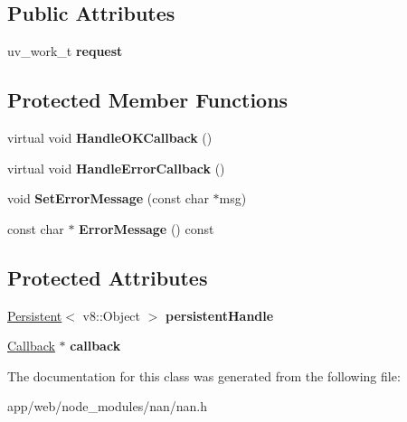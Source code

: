 \subsection*{Public Attributes}
\begin{DoxyCompactItemize}
\item 
\mbox{\label{class_nan_1_1_async_worker_ad93fc2e68413cea89fb529c4bd5f04b1}} 
uv\+\_\+work\+\_\+t {\bfseries request}
\end{DoxyCompactItemize}
\subsection*{Protected Member Functions}
\begin{DoxyCompactItemize}
\item 
\mbox{\label{class_nan_1_1_async_worker_a9946ddbe2ca5929329858b9cec36f68a}} 
virtual void {\bfseries Handle\+O\+K\+Callback} ()
\item 
\mbox{\label{class_nan_1_1_async_worker_a148febef6c47422fb0b3202e64cf3a51}} 
virtual void {\bfseries Handle\+Error\+Callback} ()
\item 
\mbox{\label{class_nan_1_1_async_worker_ad5fc83346a5870b091c12f82547e1cf1}} 
void {\bfseries Set\+Error\+Message} (const char $\ast$msg)
\item 
\mbox{\label{class_nan_1_1_async_worker_af17ed4e1f1d0f847de94dee9a8c043b5}} 
const char $\ast$ {\bfseries Error\+Message} () const
\end{DoxyCompactItemize}
\subsection*{Protected Attributes}
\begin{DoxyCompactItemize}
\item 
\mbox{\label{class_nan_1_1_async_worker_a8f9cf33aa27e45f76f707fcf42511ae1}} 
\hyperlink{class_nan_1_1_persistent}{Persistent}$<$ v8\+::\+Object $>$ {\bfseries persistent\+Handle}
\item 
\mbox{\label{class_nan_1_1_async_worker_ab04d3ed0b17e39fe2a989bcc92996e9c}} 
\hyperlink{class_nan_1_1_callback}{Callback} $\ast$ {\bfseries callback}
\end{DoxyCompactItemize}


The documentation for this class was generated from the following file\+:\begin{DoxyCompactItemize}
\item 
app/web/node\+\_\+modules/nan/nan.\+h\end{DoxyCompactItemize}
